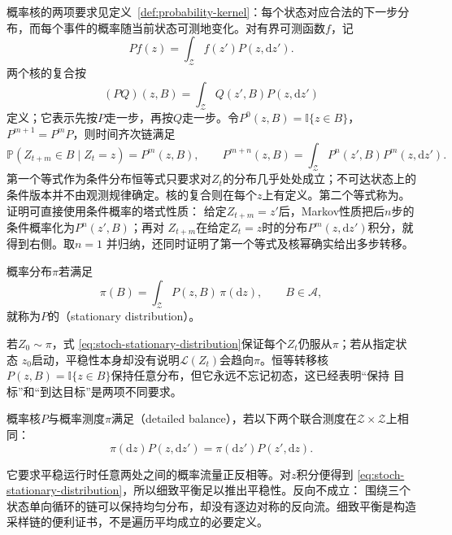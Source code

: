 概率核的两项要求见定义~\ref{def:probability-kernel}：每个状态对应合法的下一步分布，而每个事件的概率随当前状态可测地变化。对有界可测函数$f$，记
\[
  Pf(z)=\int_{\mathcal{Z}}f(z')P(z,\mathrm{d}z').
\]
两个核的复合按
\[
  (PQ)(z,B)
  =
  \int_{\mathcal{Z}}Q(z',B)P(z,\mathrm{d}z')
\]
定义；它表示先按$P$走一步，再按$Q$走一步。令$P^0(z,B)=\mathbb{I}\{z\in B\}$，
$P^{m+1}=P^mP$，则时间齐次链满足
\begin{equation}
  \mathbb{P}(Z_{t+m}\in B\mid Z_t=z)=P^m(z,B),
  \qquad
  P^{m+n}(z,B)
  =
  \int_{\mathcal{Z}}P^n(z',B)P^m(z,\mathrm{d}z').
  \label{eq:stoch-chapman-kolmogorov}
\end{equation}
第一个等式作为条件分布恒等式只要求对\(Z_t\)的分布几乎处处成立；不可达状态上的条件版本并不由观测规律确定。核的复合则在每个\(z\)上有定义。第二个等式称为。证明可直接使用条件概率的塔式性质：
给定$Z_{t+m}=z'$后，Markov性质把后$n$步的条件概率化为$P^n(z',B)$；再对
$Z_{t+m}$在给定$Z_t=z$时的分布$P^m(z,\mathrm{d}z')$积分，就得到右侧。取$n=1$
并归纳，还同时证明了第一个等式及核幂确实给出多步转移。

\begin{definition}[平稳分布]
  \label{def:stoch-stationary-distribution}
概率分布$\pi$若满足
\begin{equation}
  \pi(B)=\int_{\mathcal{Z}}P(z,B)\,\pi(\mathrm{d}z),
  \qquad B\in\mathcal{A},
  \label{eq:stoch-stationary-distribution}
\end{equation}
就称为$P$的（stationary distribution）。
\end{definition}
若$Z_0\sim\pi$，式
\eqref{eq:stoch-stationary-distribution}保证每个$Z_t$仍服从$\pi$；若从指定状态
$z_0$启动，平稳性本身却没有说明$\mathcal{L}(Z_t)$会趋向$\pi$。恒等转移核
$P(z,B)=\mathbb{I}\{z\in B\}$保持任意分布，但它永远不忘记初态，这已经表明“保持
目标”和“到达目标”是两项不同要求。

\begin{definition}[细致平衡]
  \label{def:stoch-detailed-balance}
概率核\(P\)与概率测度\(\pi\)满足（detailed balance），若以下两个联合测度在\(\mathcal Z\times\mathcal Z\)上相同：
\begin{equation}
  \pi(\mathrm{d}z)P(z,\mathrm{d}z')
  =\pi(\mathrm{d}z')P(z',\mathrm{d}z).
  \label{eq:stoch-detailed-balance}
\end{equation}
\end{definition}
它要求平稳运行时任意两处之间的概率流量正反相等。对$z$积分便得到
\eqref{eq:stoch-stationary-distribution}，所以细致平衡足以推出平稳性。反向不成立：
围绕三个状态单向循环的链可以保持均匀分布，却没有逐边对称的反向流。细致平衡是构造
采样链的便利证书，不是遍历平均成立的必要定义。
